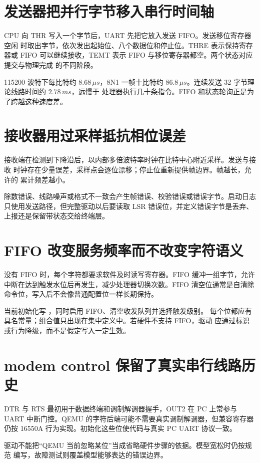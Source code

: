 \section{发送器把并行字节移入串行时间轴}

CPU 向 THR 写入一个字节后，UART 先把它放入发送 FIFO。发送移位寄存器空闲
时取出字节，依次发出起始位、八个数据位和停止位。THRE 表示保持寄存器或 FIFO
可以继续接收，TEMT 表示 FIFO 与移位寄存器都空。两个状态对应提交与物理完成
的不同阶段。

115200 波特下每比特约 \(8.68\,\mu s\)，8N1 一帧十比特约
\(86.8\,\mu s\)。连续发送 32 字节理论线路时间约 \(2.78\,ms\)，远慢于
处理器执行几十条指令。FIFO 和状态轮询正是为了跨越这种速度差。

\section{接收器用过采样抵抗相位误差}

接收端在检测到下降沿后，以内部多倍波特率时钟在比特中心附近采样。发送与接收
时钟存在少量误差，采样点会逐位漂移；停止位重新提供帧边界。帧越长，允许的
累计频差越小。

除数错误、线路噪声或格式不一致会产生帧错误、校验错误或错误字节。启动日志
只使用发送路径，但完整驱动以后要读取 LSR 错误位，并定义错误字节是丢弃、
上报还是保留带状态交给终端层。

\section{FIFO 改变服务频率而不改变字符语义}

没有 FIFO 时，每个字符都要求软件及时读写寄存器。FIFO 缓冲一组字节，允许
中断在达到触发水位后再发生，减少处理器切换次数。FIFO 清空位通常是自清除
命令位，写入后不会像普通配置位一样长期保持。

当前初始化写 ，同时启用 FIFO、清空收发队列并选择触发级别。
每个位都应有具名常量；组合值只出现在集中定义中。若硬件不支持 FIFO，驱动
应通过标识或行为降级，而不是假定写入一定生效。

\section{modem control 保留了真实串行线路历史}

DTR 与 RTS 最初用于数据终端和调制解调器握手，OUT2 在 PC 上常参与 UART
中断门控。QEMU 的字符后端可能不需要真实调制解调器，但兼容寄存器仍按
16550A 行为实现。初始化这些位使代码与真实 PC UART 协议一致。

驱动不能把“QEMU 当前忽略某位”当成省略硬件步骤的依据。模型宽松时仍按规范
编写，故障测试则覆盖模型能够表达的错误边界。

